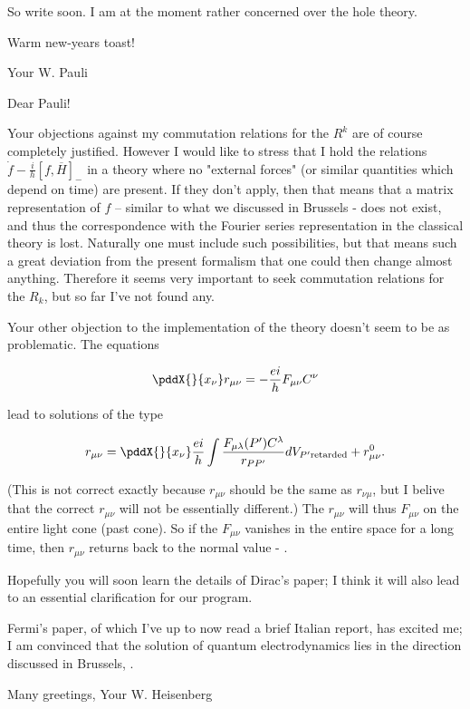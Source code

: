 \documentclass{article}
\newcommand{\uequ}[1]{
\begin{align*}
#1
\end{align*}
}
\begin{document}
So write soon. I am at the moment rather concerned over the hole theory.

Warm new-years toast!

Your W. Pauli

\date{January 12, 1934}

Dear Pauli!

Your objections against my commutation relations for the $R^k$ are of course completely justified. However I would like to stress that I hold the relations $\dot{f}- \frac{i}{h}[f,\overline{H}]_{-}$  in a theory where no "external forces" (or similar quantities which depend on time) are present. If they don't apply, then that means that a matrix representation of $f$ -- similar to what we discussed in Brussels - does not exist, and thus the correspondence with the Fourier series representation in the classical theory is lost. Naturally one must include such possibilities, but that means such a great deviation from the present formalism that one could then change almost anything. Therefore it seems very important to seek commutation relations for the $R_k$, but so far I've not found any.

Your other objection to the implementation of the theory doesn't seem to be as problematic. The equations
\uequ{
\pddX{}{x_\nu}r_{\mu\nu} = -\frac{ei}{h}F_{\mu\nu}C^\nu
}
lead to solutions of the type
\uequ{
r_{\mu\nu} = \pddX{}{x_\nu}\frac{ei}{h}
\int\frac{F_{\mu\lambda}(P')C^\lambda}{r_{PP'}}{dV_{P'\text{retarded}}} + r^0_{\mu\nu}.
}
(This is not correct exactly because $r_{\mu\nu}$ should be the same as $r_{\nu\mu}$, but I belive that the correct $r_{\mu\nu}$ will not be essentially different.) The $r_{\mu\nu}$ will thus  $F_{\mu\nu}$ on the entire light cone (past cone). So if the $F_{\mu\nu}$ vanishes in the entire space for a long time, then $r_{\mu\nu}$ returns back to the normal value - .

Hopefully you will soon learn the details of Dirac's paper; I think it will also lead to an essential clarification for our program.

Fermi's paper, of which I've up to now read a brief Italian report, has excited me; I am convinced that the solution of quantum electrodynamics lies in the direction discussed in Brussels, .

Many greetings,
Your W. Heisenberg
\end{document}
